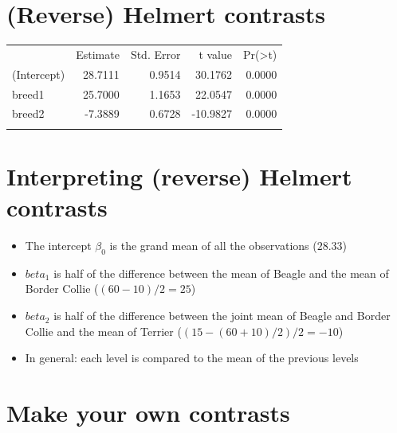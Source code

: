 \documentclass[]{article}
\newenvironment{Shaded}{}{}
\newcommand{\KeywordTok}[1]{\textcolor[rgb]{0.00,0.44,0.13}{\textbf{{#1}}}}
\newcommand{\DataTypeTok}[1]{\textcolor[rgb]{0.56,0.13,0.00}{{#1}}}
\newcommand{\StringTok}[1]{\textcolor[rgb]{0.25,0.44,0.63}{{#1}}}
\newcommand{\NormalTok}[1]{{#1}}
\begin{document}
\section{(Reverse) Helmert contrasts}\label{reverse-helmert-contrasts}

\begin{Shaded}
\end{Shaded}

\begin{longtable}[c]{@{}lrrrr@{}}
\toprule\addlinespace
& Estimate & Std. Error & t value &
Pr(\textgreater{}\textbar{}t\textbar{})
\\\addlinespace
\midrule\endhead
(Intercept) & 28.7111 & 0.9514 & 30.1762 & 0.0000
\\\addlinespace
breed1 & 25.7000 & 1.1653 & 22.0547 & 0.0000
\\\addlinespace
breed2 & -7.3889 & 0.6728 & -10.9827 & 0.0000
\\\addlinespace
\bottomrule
\end{longtable}

\section{Interpreting (reverse) Helmert
contrasts}\label{interpreting-reverse-helmert-contrasts}

\begin{itemize}
\itemsep1pt\parskip0pt
\item
  The intercept $\beta_0$ is the grand mean of all the observations
  ($28.33$)
\item
  $beta_1$ is half of the difference between the mean of Beagle and the
  mean of Border Collie ($(60 - 10)/2 = 25$)
\item
  $beta_2$ is half of the difference between the joint mean of Beagle
  and Border Collie and the mean of Terrier ($(15 - (60+10)/2)/2 = -10$)
\item
  In general: each level is compared to the mean of the previous levels
\end{itemize}

\section{Make your own contrasts}\label{make-your-own-contrasts}
\end{document}
